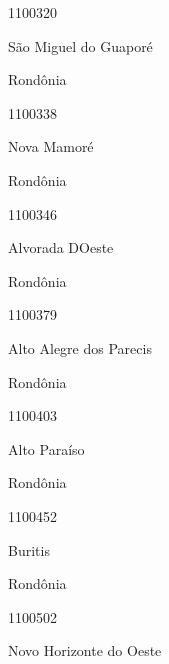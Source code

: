 \documentclass[
  letterpaper,
]{report}
\begin{document}
\n      

1100320

\n      

São Miguel do Guaporé

\n    

\n    

\n      

Rondônia

\n      

1100338

\n      

Nova Mamoré

\n    

\n    

\n      

Rondônia

\n      

1100346

\n      

Alvorada D\textquotesingle Oeste

\n    

\n    

\n      

Rondônia

\n      

1100379

\n      

Alto Alegre dos Parecis

\n    

\n    

\n      

Rondônia

\n      

1100403

\n      

Alto Paraíso

\n    

\n    

\n      

Rondônia

\n      

1100452

\n      

Buritis

\n    

\n    

\n      

Rondônia

\n      

1100502

\n      

Novo Horizonte do Oeste
\end{document}
